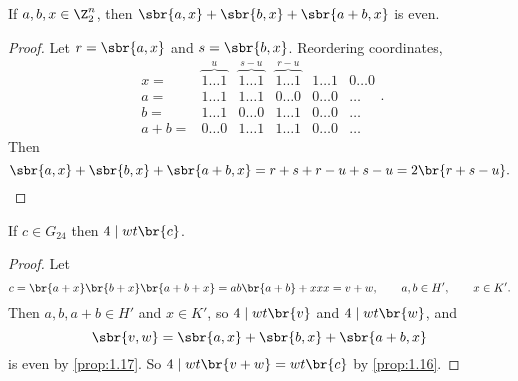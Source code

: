 \pagebreak


\begin{proposition}
\label{prop:1.17}
If $ a, b, x \in \Z_2^n $, then $ \sbr{a, x} + \sbr{b, x} + \sbr{a + b, x} $ is even.
\end{proposition}

\begin{proof}
Let $ r = \sbr{a, x} $ and $ s = \sbr{b, x} $. Reordering coordinates,
$$
\begin{array}{rccccc}
x = & \overbrace{1 \dots 1}^u & \overbrace{1 \dots 1}^{s - u} & \overbrace{1 \dots 1}^{r - u} & 1 \dots 1 & 0 \dots 0 \\
a = & 1 \dots 1 & 1 \dots 1 & 0 \dots 0 & 0 \dots 0 & \dots \\
b = & 1 \dots 1 & 0 \dots 0 & 1 \dots 1 & 0 \dots 0 & \dots \\
a + b = & 0 \dots 0 & 1 \dots 1 & 1 \dots 1 & 0 \dots 0 & \dots
\end{array}.
$$
Then
$$ \sbr{a, x} + \sbr{b, x} + \sbr{a + b, x} = r + s + r - u + s - u = 2\br{r + s - u}. $$
\end{proof}

\begin{proposition}
\label{prop:1.18}
If $ c \in G_{24} $ then $ 4 \mid wt\br{c} $.
\end{proposition}

\begin{proof}
Let
$$ c = \br{a + x}\br{b + x}\br{a + b + x} = ab\br{a + b} + xxx = v + w, \qquad a, b \in H', \qquad x \in K'. $$
Then $ a, b, a + b \in H' $ and $ x \in K' $, so $ 4 \mid wt\br{v} $ and $ 4 \mid wt\br{w} $, and
$$ \sbr{v, w} = \sbr{a, x} + \sbr{b, x} + \sbr{a + b, x} $$
is even by \ref{prop:1.17}. So $ 4 \mid wt\br{v + w} = wt\br{c} $ by \ref{prop:1.16}.
\end{proof}

